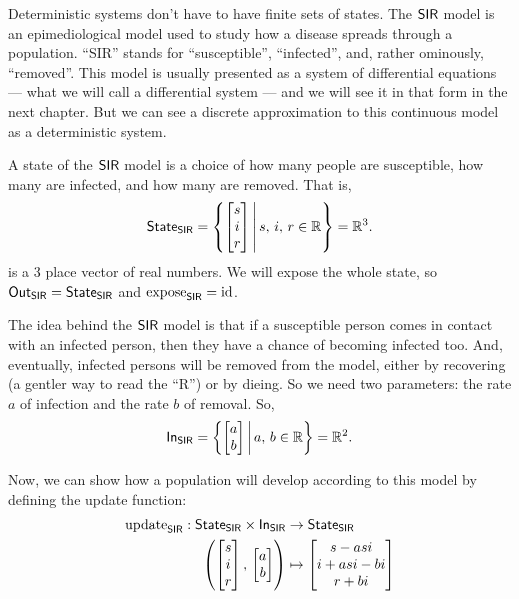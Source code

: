 \documentclass[DynamicalBook]{subfiles}
\begin{document}
\begin{example}\label{ex.SIR_model_discrete}
  Deterministic systems don't have to have finite sets of states. The $\mathsf{SIR}$ model
  is an epimediological model used to study how a disease spreads through a
  population. ``SIR'' stands for ``susceptible'', ``infected'', and, rather
  ominously, ``removed''. This model is usually presented as a system of
  differential equations --- what we will call a differential system --- and we will see it in that form in the next chapter.
  But we can see a discrete approximation to this continuous model as a
  deterministic system.

  A state of the $\mathsf{SIR}$ model is a choice of how many people are susceptible, how
  many are infected, and how many are removed. That is,
  $$\mathsf{State}_{\mathsf{SIR}} = \left\{\begin{bmatrix} s \\ i \\ r \end{bmatrix}\, \middle|\, s,\, i,\, r\in \mathbb{R}\right\} = \mathbb{R}^3.$$
  is a 3 place vector of real numbers. We will expose the whole state, so
  $\mathsf{Out}_{\mathsf{SIR}} = \mathsf{State}_{\mathsf{SIR}}$ and $\mathrm{expose}_{\mathsf{SIR}} = \mathrm{id}$.

  The idea behind the $\mathsf{SIR}$ model is that if a susceptible person comes in
  contact with an infected person, then they have a chance of becoming infected
  too. And, eventually, infected persons will be removed from the model, either
  by recovering (a gentler way to read the ``R'') or by dieing. So we need two
  parameters: the rate $a$ of infection and the rate $b$ of removal. So,
  $$\mathsf{In}_{\mathsf{SIR}} = \left\{\begin{bmatrix} a \\ b \end{bmatrix}\, \middle|\, a,\, b \in \mathbb{R}\right\} = \mathbb{R}^2.$$

  Now, we can show how a population will develop according to this model by
  defining the update function:
  \begin{align}\label{eqn.SIR_model_discrete}
    \mathrm{update}_{\mathsf{SIR}} : \mathsf{State}_{\mathsf{SIR}} \times \mathsf{In}_{\mathsf{SIR}} &\to \mathsf{State}_{\mathsf{SIR}}\\
    \left( \begin{bmatrix} s\\ i\\ r\\ \end{bmatrix},\, \begin{bmatrix}a \\ b \end{bmatrix} \right) &\mapsto \begin{bmatrix}s - a s i \\ i + a s i - b  i \\ r + b i \end{bmatrix}
  \end{align}

\end{example}
\end{document}
